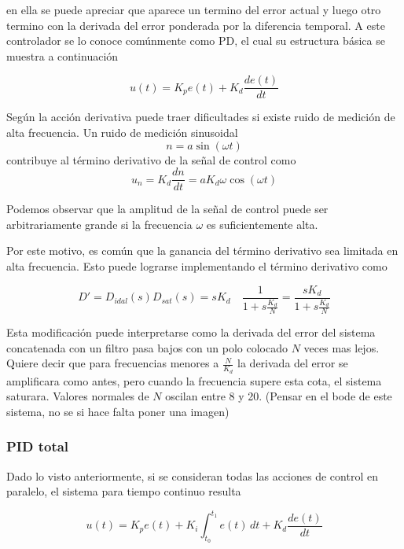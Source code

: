 \documentclass[10pt,conference,a4paper,onecolumn]{article}%
\begin{document}
en ella se puede apreciar que aparece un termino del error actual y luego otro termino con la derivada del error ponderada por la diferencia temporal. A este controlador se lo conoce comúnmente como PD, el cual su estructura básica se muestra a continuación

\begin{equation}
u(t)=K_pe(t)+K_d\frac{de(t)}{dt}
\end{equation}

Según \cite[pág. 40]{biblia_PID} la acción derivativa puede traer dificultades si existe ruido de medición de alta frecuencia. Un ruido de medición sinusoidal
\begin{equation*}
n=a\sin(\omega t)
\end{equation*}
contribuye al término derivativo de la señal de control como
\begin{equation*}
u_n=K_d \frac{dn}{dt}=aK_d\omega\cos(\omega t)
\end{equation*}

Podemos observar que la amplitud de la señal de control puede ser arbitrariamente grande si la frecuencia $\omega$ es suficientemente alta.

Por este motivo, es común que la ganancia del término derivativo sea limitada en alta frecuencia. Esto puede lograrse implementando el término derivativo como


\begin{equation}
D'=D_{idal}(s)D_{sat}(s) =sK_d \quad  \frac{1}{1+s\frac{K_d}{N}} =    \frac{sK_d}{1+s\frac{K_d}{N}}
\label{eq:ajuste_deriv}
\end{equation}

Esta modificación puede interpretarse como la derivada del error del sistema concatenada con un filtro pasa bajos con un polo colocado $N$ veces mas lejos. Quiere decir que para frecuencias menores a $\frac{N}{K_d}$ la derivada del error se amplificara como antes, pero cuando la frecuencia supere esta cota, el sistema saturara. Valores normales de $N$ oscilan entre 8 y 20. (Pensar en el bode de este sistema, no se si hace falta poner una imagen)  

\subsubsection{PID total}

Dado lo visto anteriormente, si se consideran todas las acciones de control en paralelo, el sistema para tiempo continuo resulta

\begin{equation}
u(t)=K_pe(t)+K_i \int_{t_0}^{t_1} e(t) \,dt + K_d \frac{de(t)}{dt}
\end{equation}
\end{document}
